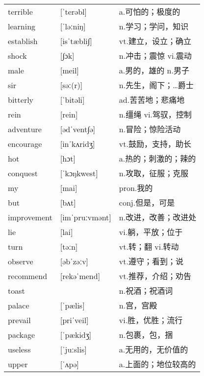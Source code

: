 \documentclass[a4paper]{article}
\begin{document}
\section{}
\begin{tabular}{l l l}

terrible & [ˈterəbl] & a.可怕的；极度的 \\
learning & [ˈləːniŋ] & n.学习；学问，知识 \\
establish & [isˈtæbli∫] & vt.建立，设立；确立 \\
shock & [∫ɔk] & n.冲击；震惊 vi.震动 \\
male & [meil] & a.男的，雄的 n.男子 \\
sir & [səː(r)] & n.先生，阁下；…爵士 \\
bitterly & [ˈbitəli] & ad.苦苦地；悲痛地 \\
rein & [rein] & n.缰绳 vi.驾驭，控制 \\
adventure & [ədˈvent∫ə] & n.冒险；惊险活动 \\
encourage & [inˈkʌridʒ] & vt.鼓励，支持，助长 \\
hot & [hɔt] & a.热的；刺激的；辣的 \\
conquest & [ˈkɔŋkwest] & n.攻取，征服；克服 \\
my & [mai] & pron.我的 \\
but & [bʌt] & conj.但是，可是 \\
improvement & [imˈpruːvmənt] & n.改进，改善；改进处 \\
lie & [lai] & vi.躺，平放；位于 \\
turn & [təːn] & vt.转；翻 vi.转动 \\
observe & [əbˈzəːv] & vt.遵守；看到；说 \\
recommend & [rekəˈmend] & vt.推荐，介绍；劝告 \\
toast &  & n.祝酒；祝酒词 \\
palace & [ˈpælis] & n.宫，宫殿 \\
prevail & [priˈveil] & vi.胜，优胜；流行 \\
package & [ˈpækidʒ] & n.包裹，包，捆 \\
useless & [ˈjuːslis] & a.无用的，无价值的 \\
upper & [ˈʌpə] & a.上面的；地位较高的 \\

\end{tabular}
\end{document}
